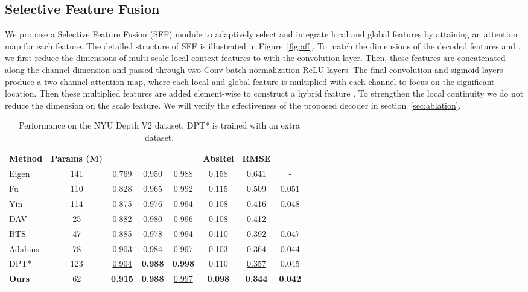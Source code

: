 \documentclass{article}
\makeatletter
\let\@internalcite\cite
\def\cite{\def\citeauthoryear##1##2{##1, ##2}\@internalcite}
\makeatother
\begin{document}
\subsection{Selective Feature Fusion} We propose a Selective Feature Fusion (SFF) module to adaptively select and integrate local and global features by attaining an attention map for each feature. The detailed structure of SFF is illustrated in Figure~\ref{fig:aff}.
To match the dimensions of the decoded features  and , we first reduce the dimensions of multi-scale local context features to  with the convolution layer.
Then, these features are concatenated along the channel dimension and passed through two  Conv-batch normalization-ReLU layers.
The final convolution and sigmoid layers produce a two-channel attention map, where each local and global feature is multiplied with each channel to focus on the significant location. Then these multiplied features are added element-wise to construct a hybrid feature  .
To strengthen the local continuity we do not reduce the dimension on the  scale feature. We will verify the effectiveness of the proposed decoder in section~\ref{sec:ablation}. 




\begin{table*}[t]
 \centering
  \begin{tabular}{l | c| ccccccc}
    \toprule
        Method & Params (M)&  &  &  & AbsRel  & RMSE  &   \\
        \midrule
        Eigen~\cite{eigen2014depth}  & 141 & 0.769 & 0.950 & 0.988 & 0.158 & 0.641 & -\\
        Fu~\cite{fu2018deep} & 110 & 0.828 & 0.965 & 0.992 & 0.115 & 0.509 & 0.051  \\
        Yin~\cite{yin2019enforcing} & 114 & 0.875 & 0.976 & 0.994 & 0.108 & 0.416 & 0.048  \\
        DAV~\cite{huynh2020guiding} & 25 & 0.882 & 0.980 & 0.996 & 0.108 & 0.412 & -  \\\textbf{}
        BTS~\cite{lee2019big} \hspace{1mm} & 47 & 0.885 & 0.978 & 0.994 & 0.110 & 0.392 & 0.047 \\
        Adabins\cite{bhat2021adabins} \hspace{1mm} & 78 & 0.903 & 0.984 & 0.997 & \underline{0.103} &  0.364 & \underline{0.044} \\
        DPT*~\cite{ranftl2021vision} \hspace{1mm} & 123 &  \underline{0.904} & \textbf{0.988} & \textbf{0.998} & 0.110 & \underline{0.357} & 0.045 \\
        \midrule
        \textbf{Ours} &  62 & \textbf{0.915} & \textbf{0.988} & \underline{0.997} & \textbf{0.098} & \textbf{0.344} & \textbf{0.042}\\
\bottomrule
  \end{tabular}
  \vspace{-2mm}
  \caption{Performance on the NYU Depth V2 dataset. DPT* is trained with an extra dataset.}
  \label{tab:nyu}
\end{table*}
\end{document}
